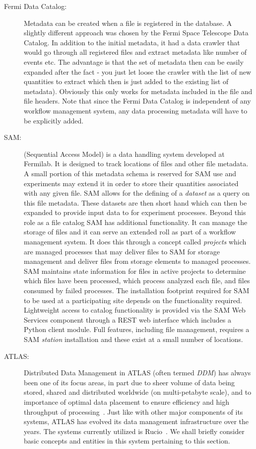 \begin{description}
\item[Fermi Data Catalog:] Metadata can be created when a file is registered in the database. A slightly
different approach was chosen by the Fermi Space Telescope Data Catalog. In addition to the initial metadata, it had a
data crawler that would go through all registered files and extract metadata like number of events etc. The advantage is
that the set of metadata then can be easily expanded after the fact - you just let loose the crawler with the list
of new quantities to extract which then is just added to the existing list of metadata). Obviously this only works for 
metadata included in the file and file headers.  Note that since the Fermi Data Catalog is independent of any
workflow management system, any data processing metadata will have to be explicitly added. 


\item[SAM:] (Sequential Access Model) is a data handling system
  developed at Fermilab.  It is designed to track locations of files
  and other file metadata.  A small portion of this metadata schema is
  reserved for SAM use and experiments may extend it in order to store
  their quantities associated with any given file.  SAM allows for the
  defining of a \textit{dataset} as a query on this file metadata.
  These datasets are then short hand which can then be expanded to
  provide input data to for experiment processes.  Beyond this role as
  a file catalog SAM has additional functionality.  It can manage the
  storage of files and it can serve an extended roll as part of a workflow
  management system.  It does this through a concept called
  \textit{projects} which are managed processes that may deliver files
  to SAM for storage management and deliver files from storage elements
  to managed processes. SAM maintains state information for files in
  active projects to determine which files have been processed, which process
  analyzed each file, and files consumed by failed processes. The installation footprint required
  for SAM to be used at a participating site depends on the
  functionality required.  Lightweight access to catalog functionality
  is provided via the SAM Web Services component through a REST web
  interface which includes a Python client module.  Full features,
  including file management, requires a SAM \textit{station}
  installation and these exist at a small number of locations.

\item[ATLAS:] Distributed Data Management in ATLAS (often termed \textit{DDM}) has always been one of its focus areas, in part due to sheer volume of
data being stored, shared and distributed worldwide (on multi-petabyte scale), and to importance of optimal data placement to ensure efficiency
and high throughput of processing~\cite{atlas_ddm_chep12}. Just like with other major components of its systems, ATLAS has evolved its
data management infrastructure over the years. The systems currently utilized is Rucio~\cite{rucio_chep13}. We shall briefly consider basic
concepts and entities in this system pertaining to this section.


\end{description}
